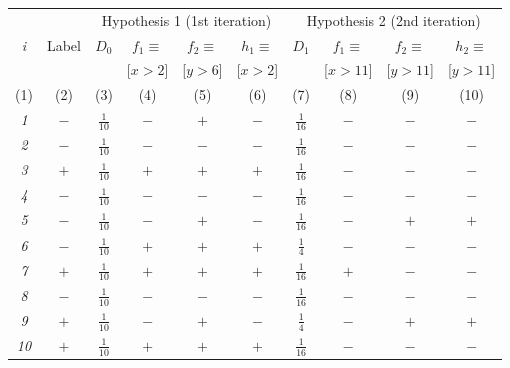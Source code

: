 \documentclass[12pt]{article}
\begin{document}
\begin{center}
        \hspace*{-2cm}
        \begin{tabular}{|c|c||c|c|c|c||c|c|c|c|}
                \hline
                & & \multicolumn{4}{c||}{Hypothesis 1 (1st iteration)}
                & \multicolumn{4}{c|}{Hypothesis 2 (2nd iteration)} \\
                \cline{3-10}
                {\em i} & Label & $D_0$ & $f_1 \equiv $ & $f_2 \equiv $ & $h_1\equiv$ & $D_1$ &  $f_1 \equiv $ & $f_2 \equiv $ & $h_2 \equiv $ \\
                & & & [$x > 2$] & [$y > 6$] & [$x > 2$] & & [$x > 11$] & [$y > 11 $] & [$y > 11$] \\
                \tiny{(1)} & \tiny{(2)} & \tiny{(3)} & \tiny{(4)} &  \tiny{(5)} & \tiny{(6)} & \tiny{(7)} & \tiny{(8)} & \tiny{(9)} & \tiny{(10)}\\
                \hline \hline
                {\em 1} & $-$ & \(\frac{1}{10}\) & \(-\) & \(+\) & \(-\) & \(\frac{1}{16}\) & \(-\) & \(-\) & \(-\) \\
                \hline
                {\em 2} & $-$ & \(\frac{1}{10}\) & \(-\) & \(-\) & \(-\) & \(\frac{1}{16}\) & \(-\) & \(-\) & \(-\) \\
                \hline
                {\em 3} & $+$ & \(\frac{1}{10}\) & \(+\) & \(+\) & \(+\) & \(\frac{1}{16}\) & \(-\) & \(-\) & \(-\) \\
                \hline
                {\em 4} & $-$ & \(\frac{1}{10}\) & \(-\) & \(-\) & \(-\) & \(\frac{1}{16}\) & \(-\) & \(-\) & \(-\) \\
                \hline
                {\em 5} & $-$ & \(\frac{1}{10}\) & \(-\) & \(+\) & \(-\) & \(\frac{1}{16}\) & \(-\) & \(+\) & \(+\) \\
                \hline
                {\em 6} & $-$ & \(\frac{1}{10}\) & \(+\) & \(+\) & \(+\) & \(\frac{1}{4}\) & \(-\) & \(-\) & \(-\) \\
                \hline
                {\em 7} & $+$ & \(\frac{1}{10}\) & \(+\) & \(+\) & \(+\) & \(\frac{1}{16}\) & \(+\) & \(-\) & \(-\) \\
                \hline
                {\em 8} & $-$ & \(\frac{1}{10}\) & \(-\) & \(-\) & \(-\) & \(\frac{1}{16}\) & \(-\) & \(-\) & \(-\) \\
                \hline
                {\em 9} & $+$ & \(\frac{1}{10}\) & \(-\) & \(+\) & \(-\) & \(\frac{1}{4}\) & \(-\) & \(+\) & \(+\) \\
                \hline
                {\em 10} & $+$ & \(\frac{1}{10}\) & \(+\) & \(+\) & \(+\) & \(\frac{1}{16}\) & \(-\) & \(-\) & \(-\) \\
                \hline
        \end{tabular}
        \hspace*{-2cm}
\end{center}
\end{document}
